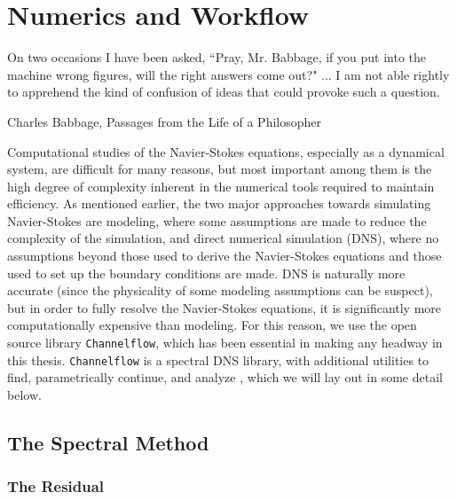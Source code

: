 \chapter{Numerics and Workflow}

    	 	\epigraph{On two occasions I have been asked, ``Pray, Mr. Babbage, if you put into the machine wrong figures, will the right answers come out?" ... I am not able rightly to apprehend the kind of confusion of ideas that could provoke such a question.}{Charles Babbage, Passages from the Life of a Philosopher}

Computational studies of the Navier-Stokes equations, especially as a dynamical system, are difficult for many reasons, but most important among them is the high degree of complexity inherent in the numerical tools required to maintain efficiency. As mentioned earlier, the two major approaches towards simulating Navier-Stokes are modeling, where some assumptions are made to reduce the complexity of the simulation, and direct numerical simulation (DNS), where no assumptions beyond those used to derive the Navier-Stokes equations and those  used to set up the boundary conditions are made. DNS is naturally more accurate (since the physicality of some modeling assumptions can be suspect), but in order to fully resolve the Navier-Stokes equations, it is significantly more computationally expensive than modeling. For this reason, we use the open source library {\tt Channelflow}, which has been essential in making any headway in this thesis. {\tt Channelflow} is a spectral DNS library, with additional utilities to find, parametrically continue, and analyze \ecs, which we will lay out in some detail below.
\section{The Spectral Method}
\subsection{The Residual}

